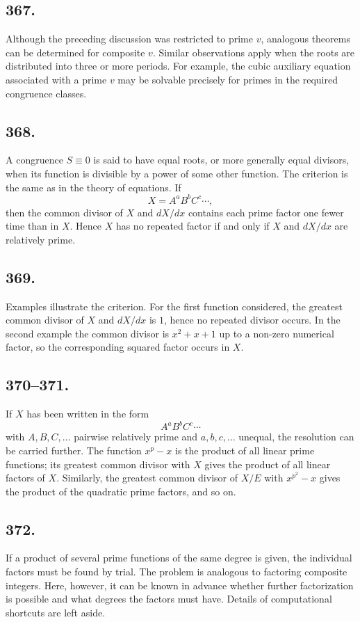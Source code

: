 \documentclass[12pt]{article}
\begin{document}
\subsection*{367.}
Although the preceding discussion was restricted to prime $v$, analogous theorems can be determined for composite $v$. Similar observations apply when the roots are distributed into three or more periods. For example, the cubic auxiliary equation associated with a prime $v$ may be solvable precisely for primes in the required congruence classes.

\subsection*{368.}
A congruence $S\equiv0$ is said to have equal roots, or more generally equal divisors, when its function is divisible by a power of some other function. The criterion is the same as in the theory of equations. If
\[
X=A^aB^bC^c\cdots,
\]
then the common divisor of $X$ and $dX/dx$ contains each prime factor one fewer time than in $X$. Hence $X$ has no repeated factor if and only if $X$ and $dX/dx$ are relatively prime.

\subsection*{369.}
Examples illustrate the criterion. For the first function considered, the greatest common divisor of $X$ and $dX/dx$ is $1$, hence no repeated divisor occurs. In the second example the common divisor is $x^2+x+1$ up to a non-zero numerical factor, so the corresponding squared factor occurs in $X$.

\subsection*{370--371.}
If $X$ has been written in the form
\[
A^aB^bC^c\cdots
\]
with $A,B,C,\ldots$ pairwise relatively prime and $a,b,c,\ldots$ unequal, the resolution can be carried further. The function $x^p-x$ is the product of all linear prime functions; its greatest common divisor with $X$ gives the product of all linear factors of $X$. Similarly, the greatest common divisor of $X/E$ with $x^{p^2}-x$ gives the product of the quadratic prime factors, and so on.

\subsection*{372.}
If a product of several prime functions of the same degree is given, the individual factors must be found by trial. The problem is analogous to factoring composite integers. Here, however, it can be known in advance whether further factorization is possible and what degrees the factors must have. Details of computational shortcuts are left aside.
\end{document}
